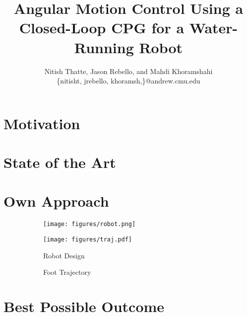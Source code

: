 \documentclass[letterpaper,twocolumn,11pt]{article}
\title{\large \textbf{Angular Motion Control Using a Closed-Loop CPG for a Water-Running Robot}}
\author{Nitish Thatte, Jason Rebello, and Mahdi Khoramshahi\\
        \small \{nitisht, jrebello, khoramsh,\}@andrew.cmu.edu
}
\date{}
\begin{document}
\maketitle

\section*{Motivation}

\vspace{-.1in}

\section*{State of the Art}

\vspace{-.1in}

\section*{Own Approach}

\vspace{-.1in}

\begin{figure}[tb]
	\centering
	\begin{subfigure}[c]{0.24\textwidth}
		\centering
		\texttt{[image: figures/robot.png]}
	\end{subfigure}
	\begin{subfigure}[c]{0.24\textwidth}
		\centering
		\texttt{[image: figures/traj.pdf]}
	\end{subfigure}

	\begin{subfigure}[c]{0.24\textwidth}
		\caption{Robot Design}
		\label{fig:robot}
	\end{subfigure}
	\begin{subfigure}[c]{0.24\textwidth}
		\caption{Foot Trajectory}
		\label{fig:traj}
	\end{subfigure}
	\vspace{-0.15in}
	\caption{}
	\vspace{-0.10in}
\end{figure}

\section*{Best Possible Outcome}

\vspace{-.1in}



\end{document}
